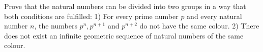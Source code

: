 Prove that the natural numbers can be divided into two groups in a way that both conditions are fulfilled:
1) For every prime number $p$ and every natural number $n$, the numbers $p^n,p^{n+1}$ and $p^{n+2}$ do not have the same colour.
2) There does not exist an infinite geometric sequence of natural numbers of the same colour.